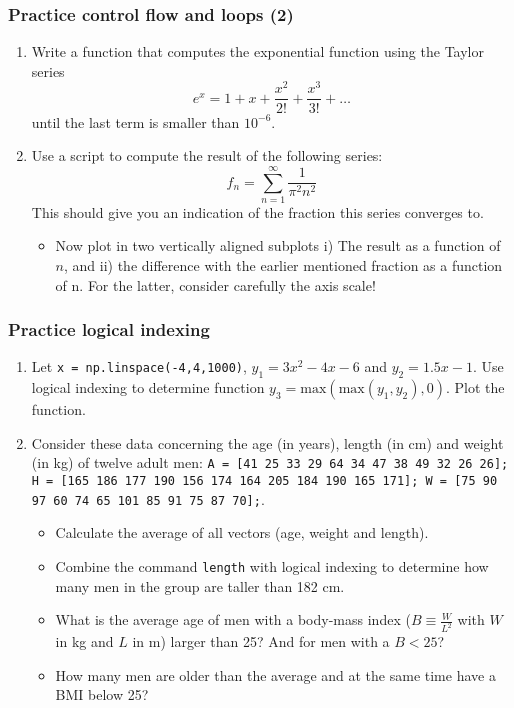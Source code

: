  \begin{frame}[fragile]
  \frametitle{Practice control flow and loops (2)}
  \begin{enumerate}
    \item Write a function that computes the exponential function using the Taylor series
    \[  e^x = 1 + x + \frac{x^2}{2!} + \frac{x^3}{3!} + \ldots \]
    until the last term is smaller than $10^{-6}$.
    \item Use a script to compute the result of the following series:
    \[
      f_n = \sum_{n=1}^{\infty} \frac{1}{\pi^2 n^2}
    \]
    This should give you an indication of the fraction this series converges to.
    \begin{itemize}
      \item Now plot in two vertically aligned subplots i) The result as a function of $n$, and ii) the difference with the earlier mentioned fraction as a function of n. For the latter, consider carefully the axis scale!
    \end{itemize}
  \end{enumerate}
 \end{frame}

 \begin{frame}[fragile]
  \frametitle{Practice logical indexing}
  \begin{enumerate}
    \item Let \lstinline$x = np.linspace(-4,4,1000)$, $y_1 = 3x^2 - 4x - 6$ and $y_2 = 1.5x - 1$. Use logical indexing to determine function $y_3 = \mathrm{max}(\mathrm{max}(y_1,y_2),0)$. Plot the function.
    \item Consider these data concerning the age (in years), length (in cm) and weight (in kg) of twelve adult men: \lstinline$A = [41 25 33 29 64 34 47 38 49 32 26 26]; H = [165 186 177 190 156 174 164 205 184 190 165 171]; W = [75 90 97 60 74 65 101 85 91 75 87 70];$.
    \begin{itemize}
      \item Calculate the average of all vectors (age, weight and length).
      \item Combine the command \lstinline$length$ with logical indexing to determine how many men in the group are taller than 182 cm.
      \item What is the average age of men with a body-mass index ($B \equiv \frac{W}{L^2}$ with $W$ in kg and $L$ in m) larger than 25? And for men with a $B<25$?
      \item How many men are older than the average and at the same time have a BMI below 25?
    \end{itemize}
  \end{enumerate}
 \end{frame}

